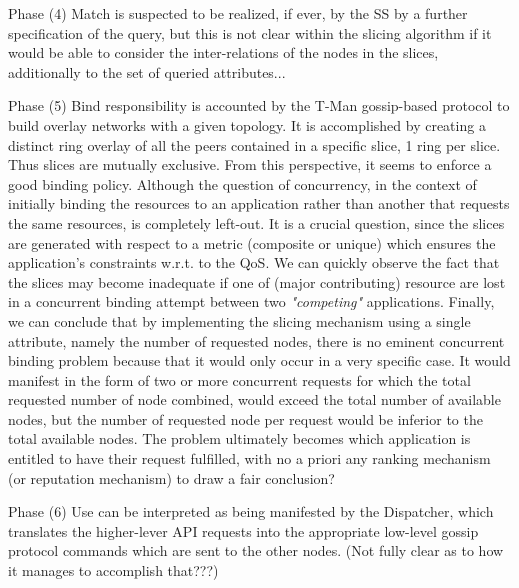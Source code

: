 \documentclass[11pt]{amsart}
\begin{document}
        
        Phase (4) {Match} is suspected to be realized, if ever, by the SS by a further
        specification of the query, but this is not clear within the slicing algorithm if
        it would be able to consider the inter-relations of the nodes in the slices,
        additionally to the set of queried attributes...

        Phase (5) {Bind} responsibility is accounted by the T-Man gossip-based protocol to
        build overlay networks with a given topology. It is accomplished by creating a
        distinct ring overlay of all the peers contained in a specific slice, 1 ring per
        slice. Thus slices are mutually exclusive. From this perspective, it seems to
        enforce a good binding policy. Although the question of concurrency, in the
        context of initially binding the resources to an application rather than another
        that requests the same resources, is completely left-out. It is a crucial
        question, since the slices are generated with respect to a metric (composite or
        unique) which ensures the application's constraints w.r.t. to the QoS. We can
        quickly observe the fact that the slices may become inadequate if one of (major
        contributing) resource are lost in a concurrent binding attempt between two
        \emph{"competing"} applications. Finally, we can conclude that by implementing the
        slicing mechanism using a single attribute, namely the number of requested nodes,
        there is no eminent concurrent binding problem because that it would only occur in
        a very specific case. It would manifest in the form of two or more concurrent
        requests for which the total requested number of node combined, would exceed the
        total number of available nodes, but the number of requested node per request
        would be inferior to the total available nodes. The problem ultimately becomes
        which application is entitled to have their request fulfilled, with no a priori
        any ranking mechanism (or reputation mechanism) to draw a fair conclusion?

        Phase (6) {Use} can be interpreted as being manifested by the Dispatcher, which
        translates the higher-lever API requests into the appropriate low-level gossip
        protocol commands which are sent to the other nodes. (Not fully clear as to how it
        manages to accomplish that???)
\end{document}
